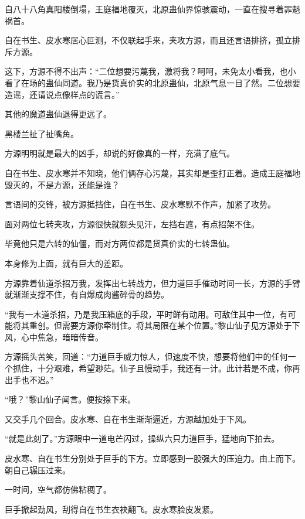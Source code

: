
\begin{this_body}



自八十八角真阳楼倒塌，王庭福地覆灭，北原蛊仙界惊骇震动，一直在搜寻着罪魁祸首。

自在书生、皮水寒居心叵测，不仅联起手来，夹攻方源，而且还言语排挤，孤立排斥方源。

这下，方源不得不出声：“二位想要污蔑我，激将我？呵呵，未免太小看我，也小看了在场的蛊仙同道。我乃是货真价实的北原蛊仙，北原气息一目了然。二位想要造谣，还请说点像样点的谎言。”

其他的魔道蛊仙退得更远了。

黑楼兰扯了扯嘴角。

方源明明就是最大的凶手，却说的好像真的一样，充满了底气。

自在书生、皮水寒并不知晓，他们俩存心污蔑，其实却是歪打正着。造成王庭福地毁灭的，不是方源，还能是谁？

言语间的交锋，被方源抵挡住，自在书生、皮水寒默不作声，加紧了攻势。

面对两位七转夹攻，方源很快就额头见汗，左挡右遮，有点招架不住。

毕竟他只是六转的仙僵，而对方两位都是货真价实的七转蛊仙。

本身修为上面，就有巨大的差距。

方源靠着仙道杀招万我，发挥出七转战力，但力道巨手催动时间一长，方源的手臂就渐渐支撑不住，有自爆成肉酱碎骨的趋势。

“我有一木道杀招，乃是我压箱底的手段，平时鲜有动用。可敌住其中一位，有可能将其重创。但需要方源你牵制住。将其局限在某个位置。”黎山仙子见方源处于下风，心中焦急，暗暗传音。

方源摇头苦笑，回道：“力道巨手威力惊人，但速度不快，想要将他们中的任何一个抓住，十分艰难，希望渺茫。仙子且慢动手，我还有一计。此计若是不成，你再出手也不迟。”

“哦？”黎山仙子闻言。便按捺下来。

又交手几个回合。皮水寒、自在书生渐渐逼近，方源越加处于下风。

“就是此刻了。”方源眼中一道电芒闪过，操纵六只力道巨手，猛地向下拍去。

皮水寒、自在书生分别处于巨手的下方。立即感到一股强大的压迫力。由上而下。朝自己辗压过来。

一时间，空气都仿佛粘稠了。

巨手掀起劲风，刮得自在书生衣袂翻飞。皮水寒脸皮发紧。


\end{this_body}
